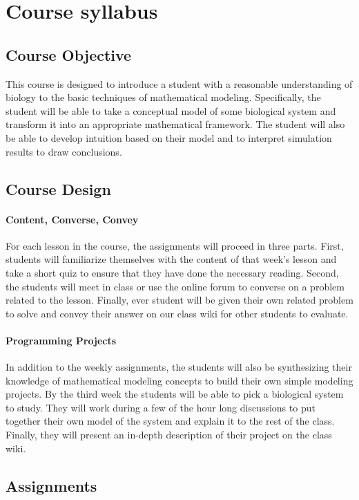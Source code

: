 \section{Course syllabus}
\subsection{Course Objective}
This course is designed to introduce a student with a reasonable understanding of
biology to the basic techniques of mathematical modeling. Specifically, the student
will be able to take a conceptual model of some biological system and transform it
into an appropriate mathematical framework. The student will also be able to develop
intuition based on their model and to interpret simulation results to draw conclusions.

\subsection{Course Design}

\paragraph{Content, Converse, Convey}
For each lesson in the course, the assignments will proceed in three parts. First,
students will familiarize themselves with the content of that week’s lesson and take a
short quiz to ensure that they have done the necessary reading. Second, the
students will meet in class or use the online forum to converse on a problem related
to the lesson. Finally, ever student will be given their own related problem to solve
and convey their answer on our class wiki for other students to evaluate.

\paragraph{Programming Projects}
In addition to the weekly assignments, the students will also be synthesizing their
knowledge of mathematical modeling concepts to build their own simple modeling
projects. By the third week the students will be able to pick a biological system to
study. They will work during a few of the hour long discussions to put together their
own model of the system and explain it to the rest of the class. Finally, they will
present an in-depth description of their project on the class wiki.

\subsection{Assignments}

